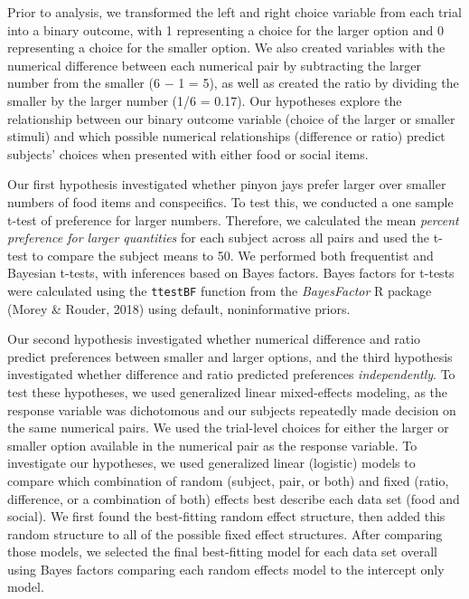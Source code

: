 \documentclass[
  ,pub,floatsintext]{apa6}
\begin{document}
Prior to analysis, we transformed the left and right choice variable from each trial into a binary outcome, with 1 representing a choice for the larger option and 0 representing a choice for the smaller option. We also created variables with the numerical difference between each numerical pair by subtracting the larger number from the smaller (6 \(-\) 1 = 5), as well as created the ratio by dividing the smaller by the larger number (1/6 = 0.17). Our hypotheses explore the relationship between our binary outcome variable (choice of the larger or smaller stimuli) and which possible numerical relationships (difference or ratio) predict subjects' choices when presented with either food or social items.

Our first hypothesis investigated whether pinyon jays prefer larger over smaller numbers of food items and conspecifics. To test this, we conducted a one sample t-test of preference for larger numbers. Therefore, we calculated the mean \emph{percent preference for larger quantities} for each subject across all pairs and used the t-test to compare the subject means to 50. We performed both frequentist and Bayesian t-tests, with inferences based on Bayes factors. Bayes factors for t-tests were calculated using the \texttt{ttestBF} function from the \emph{BayesFactor} R package (Morey \& Rouder, 2018) using default, noninformative priors.

Our second hypothesis investigated whether numerical difference and ratio predict preferences between smaller and larger options, and the third hypothesis investigated whether difference and ratio predicted preferences \emph{independently}. To test these hypotheses, we used generalized linear mixed-effects modeling, as the response variable was dichotomous and our subjects repeatedly made decision on the same numerical pairs. We used the trial-level choices for either the larger or smaller option available in the numerical pair as the response variable. To investigate our hypotheses, we used generalized linear (logistic) models to compare which combination of random (subject, pair, or both) and fixed (ratio, difference, or a combination of both) effects best describe each data set (food and social). We first found the best-fitting random effect structure, then added this random structure to all of the possible fixed effect structures. After comparing those models, we selected the final best-fitting model for each data set overall using Bayes factors comparing each random effects model to the intercept only model.
\end{document}
